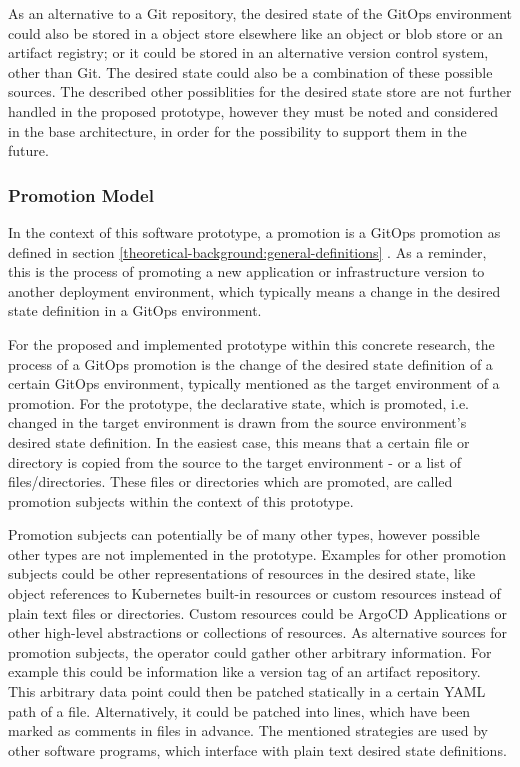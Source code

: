 As an alternative to a Git repository,
the desired state of the GitOps environment could also be stored in a object store elsewhere
like an object or blob store or an artifact registry;
or it could be stored in an alternative version control system, other than Git.
The desired state could also be a combination of these possible sources.
The described other possiblities for the desired state store are not further handled in the proposed prototype,
however they must be noted and considered in the base architecture, in order for the possibility to support
them in the future.

\subsubsection*{Promotion Model}

In the context of this software prototype,
a promotion is a GitOps promotion as defined in section
\ref{theoretical-background:general-definitions} .
As a reminder, this is the process of promoting a new application or infrastructure version
to another deployment environment, which typically means a change in the desired state definition in a GitOps environment.

For the proposed and implemented prototype within this concrete research,
the process of a GitOps promotion is the change of the desired state definition of a certain GitOps environment,
typically mentioned as the target environment of a promotion. For the prototype,
the declarative state, which is promoted, i.e. changed in the target environment is drawn from the
source environment's desired state definition. In the easiest case, this means that a certain
file or directory is copied from the source to the target environment - or a list of files/directories.
These files or directories which are promoted, are called promotion subjects within the context of this
prototype.

Promotion subjects can potentially be of many other types, however possible other types are not implemented in the prototype.
Examples for other promotion subjects could be other representations of resources in the desired state,
like object references to Kubernetes built-in resources or custom resources instead of plain text files or directories.
Custom resources could be ArgoCD Applications or other high-level abstractions or collections of resources.
As alternative sources for promotion subjects,
the operator could gather other arbitrary information. For example this could be information like a version tag
of an artifact repository.
This arbitrary data point could then be patched statically in a certain YAML path of a file.
Alternatively, it could be patched into lines, which have been marked as comments in files in advance.
The mentioned strategies are used by other software programs, which interface with plain text desired state definitions.

